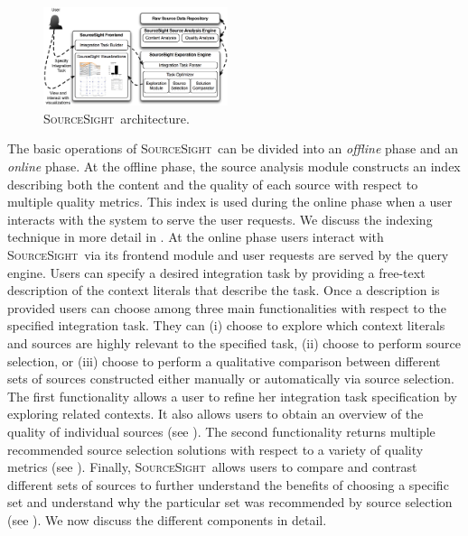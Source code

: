\documentclass{vldb}
\newcommand\system{\textsc{SourceSight}}
\begin{document}
\begin{figure}[h]
    \centering
    \includegraphics[width=0.48\textwidth]{fig/srcsightOver}
    \caption{\system~architecture.}
    \label{fig:architecture}
\end{figure}

The basic operations of \system~can be divided into an {\em offline} phase and an {\em online} phase. At the offline phase, the source analysis module constructs an index describing both the content and the quality of each source with respect to multiple quality metrics. This index is used during the online phase when a user interacts with the system to serve the user requests. We discuss the indexing technique in more detail in . At the online phase users interact with \system~via its frontend module and user requests are served by the query engine. Users can specify a desired integration task by providing a free-text description of the context literals that describe the task. Once a description is provided users can choose among three main functionalities with respect to the specified integration task. They can (i) choose to explore which context literals and sources are highly relevant to the specified task, (ii) choose to perform source selection, or (iii) choose to perform a qualitative comparison between different sets of sources constructed either manually or automatically via source selection. The first functionality allows a user to refine her integration task specification by exploring related contexts. It also allows users to obtain an overview of the quality of individual sources (see ). The second functionality returns multiple recommended source selection solutions with respect to a variety of quality metrics (see ). Finally, \system~allows users to compare and contrast different sets of sources to further understand the benefits of choosing a specific set and understand why the particular set was recommended by source selection (see ). We now discuss the different components in detail.
\end{document}
